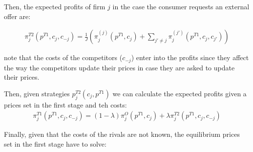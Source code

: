 \documentclass[12pt]{article}
\begin{document}
Then, the expected profits of firm $j$ in the case the consumer requests an external offer are: 

\begin{align}\label{eq:profits_external2} %
    \pi_j^{T2}(p^{T1}, c_j, c_{-j}) =  \frac{1}{J} \left( \pi_j^{(j)}(p^{T1}, c_j)   + \sum_{j'\neq j} \pi_j^{(j')}(p^{T1}, c_j, c_{j'}) \right)
\end{align}

note that the costs of the competitors ($c_{-j}$) enter into the profits since they affect the way the competitors update their prices in case they are asked to update their prices.

Then, given strategies  $p_j^{T2}(c_j, p^{T1})$ we can calculate the expected profits given a prices set in the first stage and teh costs: 
\begin{align} %
    \pi_j^{T1}(p^{T1}, c_j, c_{-j}) = (1-\lambda) \pi_j^O(p^{T1}, c_j) + \lambda \pi_j^{T2}(p^{T1}, c_j, c_{-j})
\end{align}

Finally, given that the costs of the rivals are not known, the equilibrium prices set in the first stage have to solve: 
\end{document}
